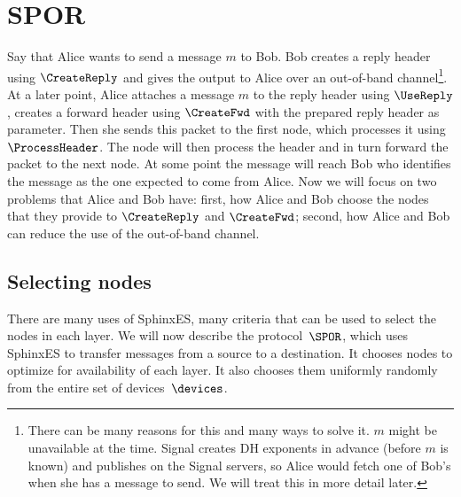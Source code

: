 
\section{\Acf*{SPOR}}%
\label{SPOR}%
\label{sec:SPOR}%
\label{sec:message_passing}%

Say that Alice wants to send a message \(m\) to Bob.
Bob creates a reply header using \(\CreateReply\) and gives the output to Alice 
over an out-of-band channel\footnote{%
  There can be many reasons for this and many ways to solve it.
  \Eg \(m\) might be unavailable at the time.
  Signal creates \ac{DH} exponents in advance (before \(m\) is known) and 
  publishes on the Signal servers, so Alice would fetch one of Bob's when she 
  has a message to send.
  We will treat this in more detail later.
}.
At a later point, Alice attaches a message \(m\) to the reply header using 
\(\UseReply\), creates a forward header using \(\CreateFwd\) with the prepared 
reply header as parameter.
Then she sends this packet to the first node, which processes it using 
\(\ProcessHeader\).
The node will then process the header and in turn forward the packet to the 
next node.
At some point the message will reach Bob who identifies the message as the 
one expected to come from Alice.
Now we will focus on two problems that Alice and Bob have:
first, how Alice and Bob choose the nodes that they provide to \(\CreateReply\) 
and \(\CreateFwd\);
second, how Alice and Bob can reduce the use of the out-of-band channel.


\subsection{Selecting nodes}

There are many uses of SphinxES, many criteria that can be used to select the 
nodes in each layer.
We will now describe the protocol~\(\SPOR\), which uses SphinxES to transfer 
messages from a source to a destination.
It chooses nodes to optimize for availability of each layer.
It also chooses them uniformly randomly from the entire set of 
devices~\(\devices\).

